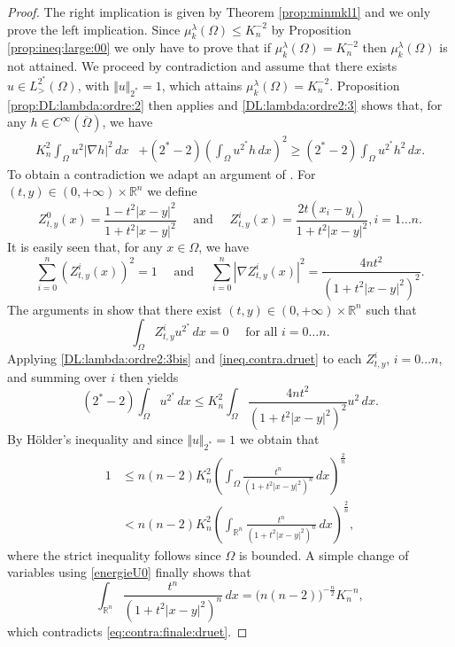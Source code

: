 \documentclass[10pt]{amsart}
\numberwithin{equation}{section}
\newcommand{\R}{\mathbb{R}}
\newcommand{\Om}{\Omega}
\newcommand{\mkl}{\mu_{k}^{\lambda}}
\theoremstyle{plain}
\theoremstyle{remark}
\begin{document}
\begin{proof}
The right implication is given by Theorem \ref{prop:minmkl1} and we only prove the left implication. Since $\mkl(\Om) \le K_n^{-2}$ by Proposition \ref{prop:ineq:large:00} we only have to prove that if $\mkl(\Om) = K_n^{-2}$ then $\mkl(\Om)$ is not attained. We proceed by contradiction and assume that there exists $u \in L^{2^*}_{>}(\Om)$, with $\Vert u \Vert_{2^*} = 1$, which attains $\mkl(\Om) = K_n^{-2}$. Proposition \ref{prop:DL:lambda:ordre:2} then applies and \eqref{DL:lambda:ordre2:3} shows that, for any $h \in C^\infty(\overline{\Om})$, we have 
\begin{equation}  \label{DL:lambda:ordre2:3bis}
\begin{aligned}
K_n^2 \int_{\Om} u^2 |\nabla h |^2 \, dx & + (2^*-2) \left( \int_{\Om} u^{2^*} h \, dx \right)^2 \ge (2^*-2) \int_{\Om} u^{2^*} h^2 \, dx.
\end{aligned} 
\end{equation}
To obtain a contradiction we adapt an argument of  \cite{Druetdim3}. For $(t,y) \in (0, + \infty) \times \R^n$ we define 
$$ Z^0_{t,y}(x) = \frac{1 -t^2|x-y|^2}{1+t^2|x-y|^2} \quad \text{ and } \quad Z^i_{t,y}(x)=  \frac{2t (x_i-y_i)}{1+t^2|x-y|^2}, i=1 \dots n.$$
It is easily seen that, for any $x \in \Om$, we have 
$$\sum_{i=0}^n (Z^i_{t,y}(x))^2 = 1 \quad \text{ and  }  \quad \sum_{i=0}^n \left| \nabla Z^i_{t,y}(x) \right|^2 = \frac{4nt^2}{(1+t^2|x-y|^2)^2}.$$
The arguments in \cite{Druetdim3} show that  there exist $(t,y) \in (0, + \infty) \times \R^n$ such that 
\begin{equation} \label{ineq.contra.druet}
\int_{\Om} Z^i_{t,y} u^{2^*} \, dx = 0 \quad \text{ for all } i=0 \dots n.   
\end{equation}
Applying \eqref{DL:lambda:ordre2:3bis} and \eqref{ineq.contra.druet} to each $Z^i_{t,y}$, $i=0 \dots n$, and summing over $i$ then yields 
$$  (2^*-2) \int_{\Om} u^{2^*} \, dx \le K_n^2 \int_{\Om} \frac{4nt^2}{(1+t^2|x-y|^2)^2} u^2 \, dx . $$
By H\"older's inequality and since $\Vert u \Vert_{2^*} = 1$ we obtain that 
\begin{equation} \label{eq:contra:finale:druet}
\begin{aligned} 
1 & \le n(n-2) K_n^2 \left(  \int_{\Om} \frac{t^n}{(1+t^2|x-y|^2)^{n}} \, dx \right)^{\frac{2}{n}} \\
& < n(n-2) K_n^2 \left(  \int_{\R^n} \frac{t^n}{(1+t^2|x-y|^2)^{n}} \, dx \right)^{\frac{2}{n}},
\end{aligned} 
 \end{equation}
 where the strict inequality follows since $\Om$ is bounded. A simple change of variables using \eqref{energieU0} finally shows that 
$$  \int_{\R^n} \frac{t^n}{(1+t^2|x-y|^2)^{n}} \, dx = \big( n(n-2) \big)^{-\frac{n}{2}} K_n^{-n}, $$
which contradicts \eqref{eq:contra:finale:druet}. 
\end{proof}
\end{document}
